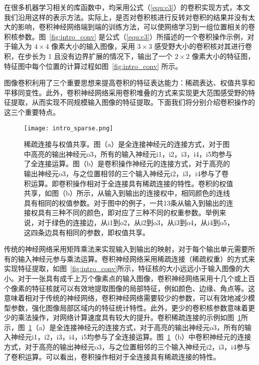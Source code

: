 在很多机器学习相关的库函数中，均采用公式（\ref{equ:c3}）的卷积实现方式，本文我们沿用这样的表示方法。实际上，是否对卷积核进行反转对卷积的结果并没有太大的影响，卷积神经网络端到端的训练方法，可以使网络学习到一组位置相关的卷积核参数。图~\ref{fig:intro_conv} 是公式（\ref{equ:c3}）所描述的一个卷积操作示例，对于输入为 $4\times4$ 像素大小的输入图像，采用 $3\times3$ 感受野大小的卷积核对其进行卷积，在步长为 1 且没有边界扩展的情况下，输出了一个 $2\times2$ 像素大小的特征图，特征图中每个位置的计算过程如图~\ref{fig:intro_conv} 所示。

图像卷积利用了三个重要思想来提高卷积的特征表达能力：稀疏表达、权值共享和平移同变性。此外，卷积神经网络采用卷积堆叠的方式来实现更大范围感受野的特征提取，从而实现不同规模输入图像的特征提取。下面我们将分别介绍卷积操作的这三个重要特点。


\begin{figure}[h]
\centering
\texttt{[image: intro\_sparse.png]}
\caption{稀疏连接与权值共享。图（a）是全连接神经元的连接方式，对于图中高亮的输出神经元o3，所有的输入神经元i1，i2，i3，i4，i5均参与了全连接运算。图（b）是卷积操作神经元的连接方式，对于高亮的输出神经元o3，与之位置相邻的三个输入神经元i2，i3，i4参与了卷积运算。即卷积操作相对于全连接具有稀疏连接的特性。卷积的权值共享，如图（b）所示，从输入到输出的连接权中，相同颜色的连线具有相同的权值参数。对于图中的例子，一共13条从输入到输出的连接权具有三种不同的颜色，即对应了三种不同的权重参数。举例来说，对于绿色的连接边，从i1到o2，从i2到o3，从i3到o4，从i4到o5，这四条边具有相同的参数，即权值共享。}
\label{fig:intro_sparse}
\end{figure}


传统的神经网络采用矩阵乘法来实现输入到输出的映射，对于每个输出单元需要所有的输入神经元参与乘法运算。卷积神经网络采用稀疏连接（稀疏权重）的方式来实现特征提取，如图~\ref{fig:intro_conv}所示，特征核的大小远远小于输入图像的大小。对于一张具有成千上万个像素点的输入图像，卷积神经网络采用十几个或上百个像素的特征核就可以有效地提取图像的局部特征，例如颜色、边缘、角点等。这意味着相对于传统的神经网络，卷积神经网络需要较少的参数，可以有效地减少模型参数，强化图像局部区域内的特征统计特性。此外，更少的卷积核参数意味着更少的乘法操作，对网络计算速度具有较大的提升。卷积稀疏连接的示例如图~\ref{fig:intro_sparse}所示，图~\ref{fig:intro_sparse}（a）是全连接神经元的连接方式，对于高亮的输出神经元o3，所有的输入神经元i1，i2，i3，i4，i5均参与了全连接运算。图~\ref{fig:intro_sparse}（b）中卷积神经元的连接方式，对于高亮的输出神经元o3，与之位置相邻的三个输入神经元i2，i3，i4参与了卷积运算。可以看出，卷积操作相对于全连接具有稀疏连接的特性。

